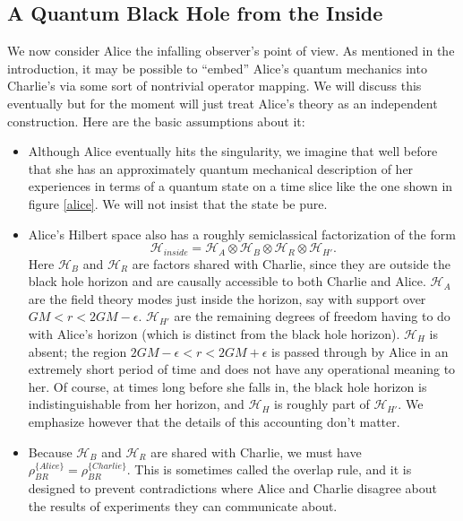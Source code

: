 \documentclass[12pt]{article}
\newcommand{\be}{\begin{equation}}
\newcommand{\ee}{\end{equation}}
\newcommand{\HH}{\mathcal{H}_H}
\newcommand{\HA}{\mathcal{H}_A}
\newcommand{\HB}{\mathcal{H}_B}
\newcommand{\HR}{\mathcal{H}_R}
\begin{document}
\subsection{A Quantum Black Hole from the Inside}
We now consider Alice the infalling observer's point of view.  As mentioned in the introduction, it may be possible to ``embed'' Alice's quantum mechanics into Charlie's via some sort of nontrivial operator mapping.  We will discuss this eventually but for the moment will just treat Alice's theory as an independent construction.  Here are the basic assumptions about it:
\begin{itemize}
\item Although Alice eventually hits the singularity, we imagine that well before that she has an approximately quantum mechanical description of her experiences in terms of a quantum state on a time slice like the one shown in figure \ref{alice}.  We will not insist that the state be pure.

\item Alice's Hilbert space also has a roughly semiclassical factorization of the form
\be
\mathcal{H}_{inside}=\HA\otimes\HB\otimes\HR \otimes\mathcal{H}_{H'}.
\ee
Here $\HB$ and $\HR$ are factors shared with Charlie, since they are outside the black hole horizon and are causally accessible to both Charlie and Alice.  $\HA$ are the field theory modes just inside the horizon, say with support over $GM<r<2GM-\epsilon$.  $\mathcal{H}_{H'}$ are the remaining degrees of freedom having to do with Alice's horizon (which is distinct from the black hole horizon).  $\HH$ is absent; the region $2GM-\epsilon<r<2GM+\epsilon$ is passed through by Alice in an extremely short period of time and does not have any operational meaning to her.  Of course, at times long before she falls in, the black hole horizon is indistinguishable from her horizon, and $\HH$ is roughly part of $\mathcal{H}_{H'}$.  We emphasize however that the details of this accounting don't matter.

\item Because $\HB$ and $\HR$ are shared with Charlie, we must have $\rho^{\{Alice\}}_{BR}=\rho^{\{Charlie\}}_{BR}$.  This is sometimes called the overlap rule, and it is designed to prevent contradictions where Alice and Charlie disagree about the results of experiments they can communicate about.
\end{itemize}
\end{document}
